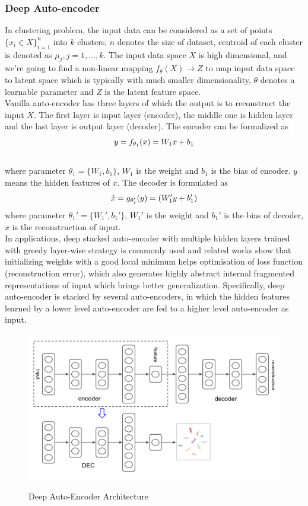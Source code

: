 \documentclass[12pt]{article}
\begin{document}
\subsubsection{Deep Auto-encoder}
In clustering problem, the input data can be considered as a set of points $\{x_i \in X\}^n_{i=1}$ into $k$ clusters, $n$ denotes the size of dataset, centroid of each cluster is denoted as $\mu_j , j = 1, . . . , k$. The input data space $X$ is high dimensional, and we're going to find a non-linear mapping $f_\theta  (X) \rightarrow Z$ to map input data space to latent space which is typically with much smaller dimensionality, $\theta$ denotes a learnable parameter and $Z$ is the latent feature space.  \\
Vanilla auto-encoder has three layers of which the output is to reconstruct the input $X$. The first layer is input layer (encoder), the middle one is hidden layer and the last layer is output layer (decoder). The encoder can be formalized as \\
\begin{equation}
\large
y=f_{\theta_1}(x) =W_1x+b_1
\end{equation} \\
where parameter $\theta_1=\{W_1,b_1\}$, $W_1$ is the weight and $b_1$ is the bias of encoder. $y$ means the hidden features of $x$. The decoder is formulated as
\begin{equation}
\large
\hat{x}=g_{{\theta_1'}}(y) = (W_1'y+b_1')
\end{equation}
where parameter $\theta_1'=\{W_1',b_1'\}$, $W_1'$ is the weight and $b_1'$ is the bias of decoder, $\hat{x}$ is the reconstruction of input. \\
In applications, deep stacked auto-encoder with multiple hidden layers trained with greedy layer-wise strategy is commonly used and related works show that  initializing weights with a good local minimum helps optimisation of loss function (reconstruction error), which also generates highly abstract internal fragmented representations of input which brings better generalization\cite{bengio2007greedy}. Specifically, deep auto-encoder is stacked by several auto-encoders, in which the hidden features learned by a lower level auto-encoder are fed to a higher level auto-encoder as input.  \\

\begin{figure}[h] 
\centering\includegraphics[width=12cm]{DAEar} 
\caption{Deep Auto-Encoder Architecture}\cite{xie2016unsupervised}
\label{fig:deepencoder}
\end{figure}  
\end{document}
